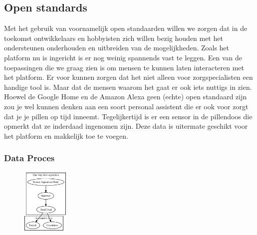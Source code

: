 \documentclass{below-ext}
\begin{document}
\subsection{Open standards}
Met het gebruik van voornamelijk open standaarden willen we zorgen dat in de toekomst ontwikkelaars en hobbyisten zich willen bezig houden met het ondersteunen onderhouden en uitbreiden van de mogelijkheden. Zoals het platform nu is ingericht is er nog weinig spannends vast te leggen. Een van de toepassingen die we graag zien is om mensen te kunnen laten interacteren met het platform. Er voor kunnen zorgen dat het niet alleen voor zorgspecialisten een handige tool is. Maar dat de mensen waarom het gaat er ook iets nuttigs in zien. Hoewel de Google Home en de Amazon Alexa geen (echte) open standaard zijn zou je wel kunnen denken aan een soort personal assistent die er ook voor zorgt dat je je pillen op tijd inneemt. Tegelijkertijd is er een sensor in de pillendoos die opmerkt dat ze inderdaad ingenomen zijn. Deze data is uitermate geschikt voor het platform en makkelijk toe te voegen.
\subsubsection{Data Proces}
\begin{figure}
\center
\includegraphics[width=0.2\textwidth]{process}
\end{figure}
\end{document}
